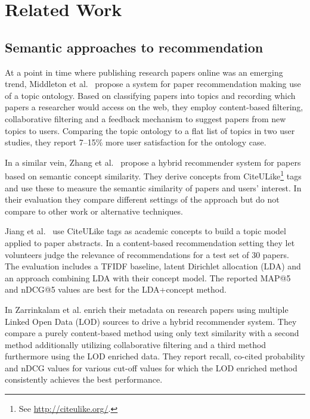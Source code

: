 \chapter{Related Work}\label{chap:relatedwork}

\section{Semantic approaches to recommendation}

At a point in time where publishing research papers online was an emerging trend, Middleton et al.~\cite{Middleton2001} propose a system for paper recommendation making use of a topic ontology. Based on classifying papers into topics and recording which papers a researcher would access on the web, they employ content-based filtering, collaborative filtering and a feedback mechanism to suggest papers from new topics to users. Comparing the topic ontology to a flat list of topics in two user studies, they report 7--15\% more user satisfaction for the ontology case.

In a similar vein, Zhang et al.~\cite{Zhang2008} propose a hybrid recommender system for papers based on semantic concept similarity. They derive concepts from CiteULike\footnote{See \url{http://citeulike.org/}.} tags and use these to measure the semantic similarity of papers and users' interest. In their evaluation they compare different settings of the approach but do not compare to other work or alternative techniques.

Jiang et al.~\cite{Jiang2012} use CiteULike tags as academic concepts to build a topic model applied to paper abstracts. In a content-based recommendation setting they let volunteers judge the relevance of recommendations for a test set of 30 papers. The evaluation includes a TFIDF baseline, latent Dirichlet allocation (LDA) and an approach combining LDA with their concept model. The reported MAP@5 and nDCG@5 values are best for the LDA+concept method.

In \cite{Zarrinkalam2012} Zarrinkalam et al. enrich their metadata on research papers using multiple Linked Open Data (LOD) sources to drive a hybrid recommender system. They compare a purely content-based method using only text similarity with a second method additionally utilizing collaborative filtering and a third method furthermore using the LOD enriched data. They report recall, co-cited probability and nDCG values for various cut-off values for which the LOD enriched method consistently achieves the best performance.


